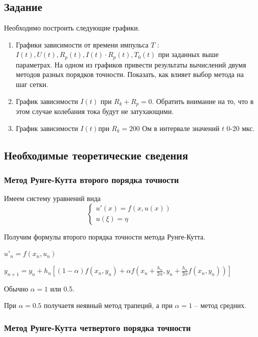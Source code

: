 \documentclass[a4paper,14pt]{article}
\begin{document}
\subsection*{Задание}

Необходимо построить следующие графики.

\begin{enumerate}
	\item Графики зависимости  от времени импульса $T$ : $I(t), U(t), R_p(t), I(t) \cdot R_p(t), T_0(t)$ при заданных выше параметрах. На одном из графиков привести результаты вычислений двумя методов разных порядков точности. Показать, как влияет выбор метода на шаг сетки.
	\item График зависимости $I(t) $ при $R_k + R_p = 0$. Обратить внимание на то, что в этом случае колебания тока будут не затухающими.
	\item График зависимости $I(t) $при $R_k = 200$ Ом в интервале  значений $t$ 0-20 мкс.
\end{enumerate}

\subsection*{Необходимые теоретические сведения}
\subsubsection*{Метод Рунге-Кутта второго порядка точности}

Имеем систему уравнений вида
\begin{equation*}
 \begin{cases}
   u'(x) = f(x, u(x)) \\
   u(\xi) = \eta
 \end{cases}
\end{equation*}

Получим формулы второго порядка точности метода Рунге-Кутта.

$u'_n = f(x_n, u_n)$

$y_{n+1} = y_n + h_n [(1 - \alpha) f(x_n, y_n) + \alpha f(x_n + \frac{h_n}{2 \alpha}, y_n + \frac{h_n}{2 \alpha}f(x_n, y_n))]$

Обычно $\alpha = 1$ или 0.5.

При $\alpha = 0.5$ получаетя неявный метод трапеций, а при $\alpha = 1$ -- метод средних. 

\subsubsection*{Метод Рунге-Кутта четвертого порядка точности}
\end{document}
